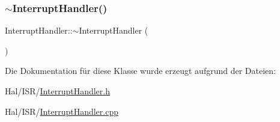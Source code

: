 \hypertarget{class_interrupt_handler_a12b87c89015a61b702184070354e7876}{}\label{class_interrupt_handler_a12b87c89015a61b702184070354e7876} 
\subsubsection{\texorpdfstring{$\sim$\+Interrupt\+Handler()}{~InterruptHandler()}}
{\footnotesize\ttfamily Interrupt\+Handler\+::$\sim$\+Interrupt\+Handler (\begin{DoxyParamCaption}{ }\end{DoxyParamCaption})\hspace{0.3cm}{\ttfamily [virtual]}}



Die Dokumentation für diese Klasse wurde erzeugt aufgrund der Dateien\+:\begin{DoxyCompactItemize}
\item 
Hal/\+I\+S\+R/\hyperlink{_interrupt_handler_8h}{Interrupt\+Handler.\+h}\item 
Hal/\+I\+S\+R/\hyperlink{_interrupt_handler_8cpp}{Interrupt\+Handler.\+cpp}\end{DoxyCompactItemize}
